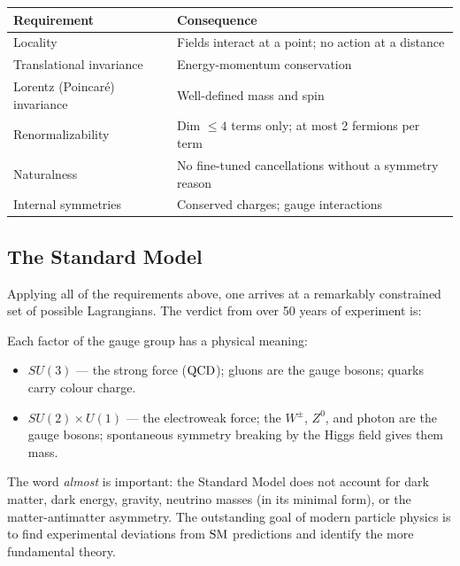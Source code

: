 \documentclass[../main.tex]{subfiles}
\begin{document}
\begin{center}
\renewcommand{\arraystretch}{1.4}
\begin{tabular}{ll}
  \toprule
  Requirement & Consequence \\
  \midrule
  Locality & Fields interact at a point; no action at a distance \\
  Translational invariance & Energy-momentum conservation \\
  Lorentz (Poincaré) invariance & Well-defined mass and spin \\
  Renormalizability & Dim $\leq4$ terms only; at most 2 fermions per term \\
  Naturalness & No fine-tuned cancellations without a symmetry reason \\
  Internal symmetries & Conserved charges; gauge interactions \\
  \bottomrule
\end{tabular}
\end{center}

\subsection*{The Standard Model}

Applying all of the requirements above, one arrives at a remarkably constrained set of possible Lagrangians.  The verdict from over 50 years of experiment is:

\begin{center}
\end{center}

Each factor of the gauge group has a physical meaning:
\begin{itemize}
  \item $SU(3)$ — the strong force ($\mathrm{QCD}$); gluons are the gauge bosons; quarks carry colour charge.
  \item $SU(2)\times U(1)$ — the electroweak force; the $W^\pm$, $Z^0$, and photon are the gauge bosons; spontaneous symmetry breaking by the Higgs field gives them mass.
\end{itemize}

The word \emph{almost} is important: the Standard Model does not account for dark matter, dark energy, gravity, neutrino masses (in its minimal form), or the matter-antimatter asymmetry.  The outstanding goal of modern particle physics is to find experimental deviations from $\mathrm{SM}{}$ predictions and identify the more fundamental theory.
\end{document}
